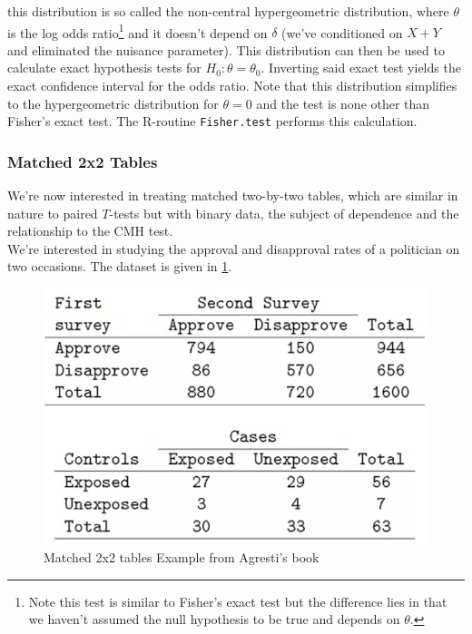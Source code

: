\documentclass{homework}
\begin{document}
this distribution is so called the non-central hypergeometric distribution, where $\theta$ is the log odds ratio\footnote{Note this test is similar to Fisher's exact test but the difference lies in that we haven't assumed the null hypothesis to be true and depends on $\theta$.} and it doesn't depend on $\delta$ (we've conditioned on $X+Y$ and eliminated the nuisance parameter). This distribution can then be used to calculate exact hypothesis tests for $H_0: \theta = \theta_0$. Inverting said exact test yields the exact confidence interval for the odds ratio. Note that this distribution simplifies to the hypergeometric distribution for $\theta = 0$ and the test is none other than Fisher's exact test. The R-routine \texttt{Fisher.test} performs this calculation. 

\subsubsection{Matched 2x2 Tables}

We're now interested in treating matched two-by-two tables, which are similar in nature to paired $T$-tests but with binary data, the subject of dependence and the relationship to the CMH test. \\


We're interested in studying the approval and disapproval rates of a politician on two occasions. The dataset is given in \ref{fig:dataset5}.

\begin{figure}
    \centering
    \includegraphics[scale=.5]{figs/data points_week4_part5.png}
    \caption{Matched 2x2 tables Example from Agresti's book}
    \label{fig:dataset5}
\end{figure}
\end{document}
